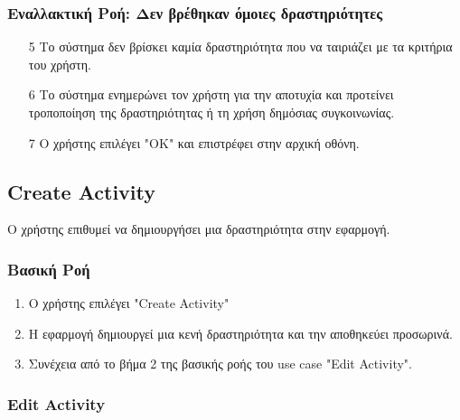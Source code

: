 \subsubsection{Εναλλακτική Ροή: Δεν βρέθηκαν όμοιες δραστηριότητες}

\begin{enumerate}
    \item[5] Το σύστημα δεν βρίσκει καμία δραστηριότητα που να ταιριάζει με τα
        κριτήρια του χρήστη.
    \item[6] Το σύστημα ενημερώνει τον χρήστη για την αποτυχία και προτείνει
        τροποποίηση της δραστηριότητας ή τη χρήση δημόσιας συγκοινωνίας.
    \item[7] Ο χρήστης επιλέγει "ΟΚ" και επιστρέφει στην αρχική οθόνη.
\end{enumerate}


\subsection{Create Activity}

Ο χρήστης επιθυμεί να δημιουργήσει μια δραστηριότητα στην εφαρμογή.

\subsubsection{Βασική Ροή}

\begin{enumerate}
    \item Ο χρήστης επιλέγει "Create Activity"
    \item Η εφαρμογή δημιουργεί μια κενή δραστηριότητα και την αποθηκεύει
          προσωρινά.
    \item Συνέχεια από το βήμα 2 της βασικής ροής του use case "Edit Activity".
\end{enumerate}


\subsubsection{Edit Activity}


